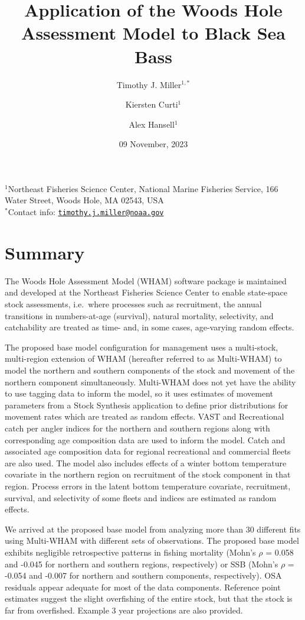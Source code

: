 \documentclass[
]{article}
\title{Application of the Woods Hole Assessment Model to Black Sea Bass}
\author{Timothy J. Miller\(^{1,*}\) \and Kiersten Curti\(^1\) \and Alex Hansell\(^1\)}
\date{09 November, 2023}
\begin{document}
\maketitle

\(^1\)Northeast Fisheries Science Center, National Marine Fisheries Service, 166 Water Street, Woods Hole, MA 02543, USA\\
\(^*\)Contact info: \href{mailto:timothy.j.miller@noaa.gov}{\nolinkurl{timothy.j.miller@noaa.gov}}

\pagebreak

\hypertarget{summary}{%
\section*{Summary}\label{summary}}

The Woods Hole Assessment Model (WHAM) software package is maintained and developed at the Northeast Fisheries Science Center to enable state-space stock assessments, i.e.~where processes such as recruitment, the annual transitions in numbers-at-age (survival), natural mortality, selectivity, and catchability are treated as time- and, in some cases, age-varying random effects.

The proposed base model configuration for management uses a multi-stock, multi-region extension of WHAM (hereafter referred to as Multi-WHAM) to model the northern and southern components of the stock and movement of the northern component simultaneously. Multi-WHAM does not yet have the ability to use tagging data to inform the model, so it uses estimates of movement parameters from a Stock Synthesis application to define prior distributions for movement rates which are treated as random effects. VAST and Recreational catch per angler indices for the northern and southern regions along with corresponding age composition data are used to inform the model. Catch and associated age composition data for regional recreational and commercial fleets are also used. The model also includes effects of a winter bottom temperature covariate in the northern region on recruitment of the stock component in that region. Process errors in the latent bottom temperature covariate, recruitment, survival, and selectivity of some fleets and indices are estimated as random effects.

We arrived at the proposed base model from analyzing more than 30 different fits using Multi-WHAM with different sets of observations. The proposed base model exhibits negligible retrospective patterns in fishing mortality (Mohn's \(\rho\) = 0.058 and -0.045 for northern and southern regions, respectively) or SSB (Mohn's \(\rho\) = -0.054 and -0.007 for northern and southern components, respectively). OSA residuals appear adequate for most of the data components. Reference point estimates suggest the slight overfishing of the entire stock, but that the stock is far from overfished. Example 3 year projections are also provided.
\end{document}
